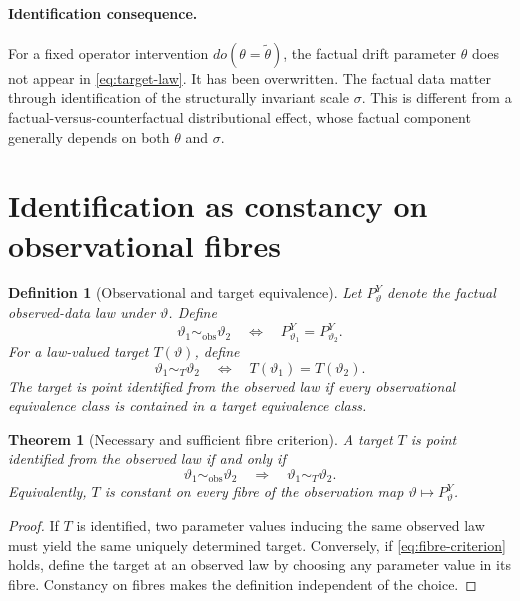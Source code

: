 \documentclass[11pt]{article}
\newtheorem{definition}[assumption]{Definition}
\newtheorem{theorem}[assumption]{Theorem}
\theoremstyle{remark}
\newcommand{\obs}{\mathrm{obs}}
\newcommand{\1}{\mathbf 1}
\begin{document}
\paragraph{Identification consequence.}
For a fixed operator intervention $do(\theta=\widetilde\theta)$, the factual drift parameter $\theta$ does not appear in \eqref{eq:target-law}.  It has been overwritten.  The factual data matter through identification of the structurally invariant scale $\sigma$.  This is different from a factual-versus-counterfactual distributional effect, whose factual component generally depends on both $\theta$ and $\sigma$.

\section{Identification as constancy on observational fibres}

\begin{definition}[Observational and target equivalence]\label{def:equivalence}
Let $P_\vartheta^Y$ denote the factual observed-data law under $\vartheta$.  Define
\[
 \vartheta_1\sim_{\obs}\vartheta_2
 \quad\Longleftrightarrow\quad
 P_{\vartheta_1}^Y=P_{\vartheta_2}^Y.
\]
For a law-valued target $T(\vartheta)$, define
\[
 \vartheta_1\sim_T\vartheta_2
 \quad\Longleftrightarrow\quad
 T(\vartheta_1)=T(\vartheta_2).
\]
The target is point identified from the observed law if every observational equivalence class is contained in a target equivalence class.
\end{definition}

\begin{theorem}[Necessary and sufficient fibre criterion]\label{thm:fibre}
A target $T$ is point identified from the observed law if and only if
\begin{equation}\label{eq:fibre-criterion}
 \vartheta_1\sim_{\obs}\vartheta_2
 \quad\Longrightarrow\quad
 \vartheta_1\sim_T\vartheta_2.
\end{equation}
Equivalently, $T$ is constant on every fibre of the observation map
$\vartheta\mapsto P_\vartheta^Y$.
\end{theorem}

\begin{proof}
If $T$ is identified, two parameter values inducing the same observed law must yield the same uniquely determined target.  Conversely, if \eqref{eq:fibre-criterion} holds, define the target at an observed law by choosing any parameter value in its fibre.  Constancy on fibres makes the definition independent of the choice.
\end{proof}
\end{document}
